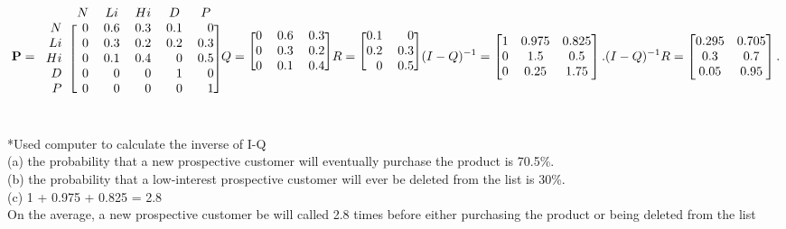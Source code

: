\documentclass[oneside,12pt]{memoir}
\begin{document}
\begin{enumerate}[leftmargin=*]
\[
\mathbf{P} = 
        \begin{blockarray}{cccccc}
           & N & Li  & Hi  &   D &   P \\
        \begin{block}{r[rrrrr]}
        N  & 0 & 0.6 & 0.3 & 0.1 & 0\\
        Li & 0 & 0.3 & 0.2 & 0.2 & 0.3\\
        Hi & 0 & 0.1 & 0.4 & 0   & 0.5\\
        D  & 0 & 0   & 0   & 1   & 0\\
        P  & 0 & 0   & 0   & 0   & 1\\ 
        \end{block}
    \end{blockarray}

Q = 
        \begin{blockarray}{ccc}
        \begin{block}{[rrr]}
        0 & 0.6 & 0.3\\
        0 & 0.3 & 0.2\\
        0 & 0.1 & 0.4\\
        \end{block}
    \end{blockarray}   
R = 
        \begin{blockarray}{ccc}
        \begin{block}{[rrr]}
        0.1 & 0\\
        0.2 & 0.3\\
        0 & 0.5\\
        \end{block}
    \end{blockarray}
\\
(I - Q)^{-1} = \begin{bmatrix}
1 & 0.975 & 0.825 \\
0 & 1.5 & 0.5 \\
0 & 0.25 & 1.75
\end{bmatrix}.
(I - Q)^{-1} R = \begin{bmatrix}
0.295 & 0.705 \\
0.3 & 0.7 \\
0.05 & 0.95
\end{bmatrix}.
\]
\\
*Used computer to calculate the inverse of I-Q\\
(a) the probability that a new prospective customer will eventually purchase the product is 70.5\%.\\
(b) the probability that a low-interest prospective customer will ever be deleted from the list is 30\%.\\
(c) 1 + 0.975 + 0.825 = 2.8\\
On the average, a new prospective customer be will called 2.8 times before either purchasing the product or being deleted from the list\\


\end{enumerate}
\end{document}
